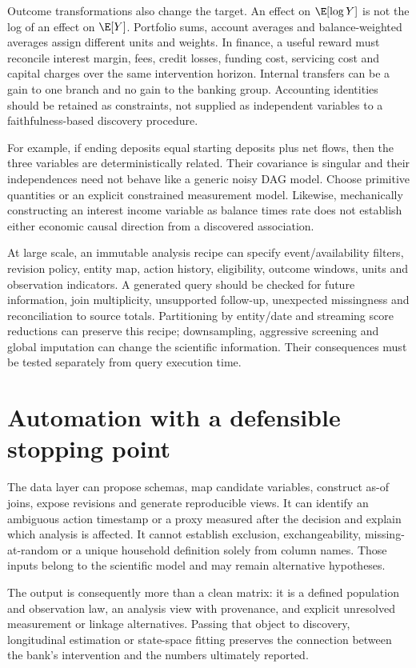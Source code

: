 Outcome transformations also change the target. An effect on
$\E[\log Y]$ is not the log of an effect on $\E[Y]$.
Portfolio sums, account averages and balance-weighted averages assign
different units and weights. In finance, a useful reward must reconcile
interest margin, fees, credit losses, funding cost, servicing cost and
capital charges over the same intervention horizon. Internal transfers
can be a gain to one branch and no gain to the banking group. Accounting
identities should be retained as constraints, not supplied as independent
variables to a faithfulness-based discovery procedure.

For example, if ending deposits equal starting deposits plus net flows,
then the three variables are deterministically related. Their covariance
is singular and their independences need not behave like a generic
noisy DAG model. Choose primitive quantities or an explicit constrained
measurement model. Likewise, mechanically constructing an interest
income variable as balance times rate does not establish either economic
causal direction from a discovered association.

At large scale, an immutable analysis recipe can specify event/availability
filters, revision policy, entity map, action history, eligibility, outcome
windows, units and observation indicators. A generated query should be
checked for future information, join multiplicity, unsupported follow-up,
unexpected missingness and reconciliation to source totals. Partitioning
by entity/date and streaming score reductions can preserve this recipe;
downsampling, aggressive screening and global imputation can change the
scientific information. Their consequences must be tested separately
from query execution time.



\section{Automation with a defensible stopping point}
The data layer can propose schemas, map candidate variables, construct
as-of joins, expose revisions and generate reproducible views. It can
identify an ambiguous action timestamp or a proxy measured after the
decision and explain which analysis is affected. It cannot establish
exclusion, exchangeability, missing-at-random or a unique household
definition solely from column names. Those inputs belong to the
scientific model and may remain alternative hypotheses.

The output is consequently more than a clean matrix: it is a defined
population and observation law, an analysis view with provenance, and
explicit unresolved measurement or linkage alternatives. Passing that
object to discovery, longitudinal estimation or state-space fitting
preserves the connection between the bank's intervention and the
numbers ultimately reported.







